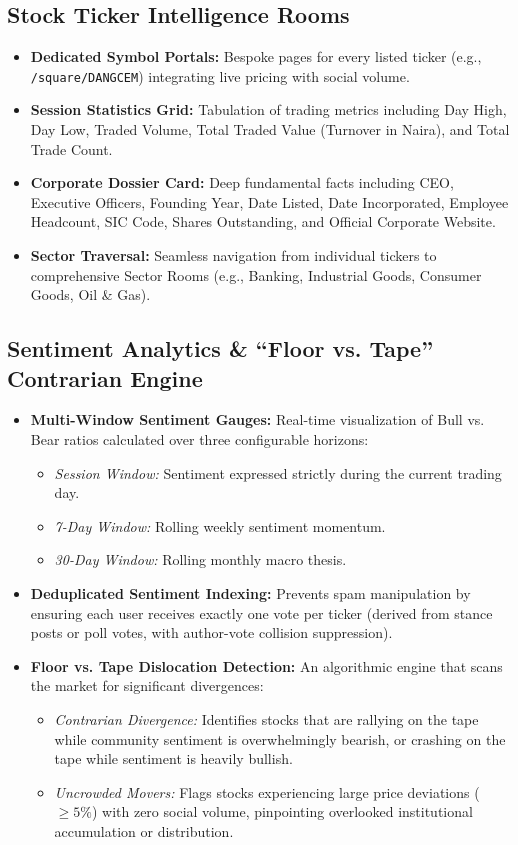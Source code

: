 \documentclass[11pt,a4paper]{article}
\begin{document}
\subsection{Stock Ticker Intelligence Rooms}
\begin{itemize}
    \item \textbf{Dedicated Symbol Portals:} Bespoke pages for every listed ticker (e.g., \texttt{/square/DANGCEM}) integrating live pricing with social volume.
    \item \textbf{Session Statistics Grid:} Tabulation of trading metrics including Day High, Day Low, Traded Volume, Total Traded Value (Turnover in Naira), and Total Trade Count.
    \item \textbf{Corporate Dossier Card:} Deep fundamental facts including CEO, Executive Officers, Founding Year, Date Listed, Date Incorporated, Employee Headcount, SIC Code, Shares Outstanding, and Official Corporate Website.
    \item \textbf{Sector Traversal:} Seamless navigation from individual tickers to comprehensive Sector Rooms (e.g., Banking, Industrial Goods, Consumer Goods, Oil \& Gas).
\end{itemize}

\subsection{Sentiment Analytics \& ``Floor vs. Tape'' Contrarian Engine}
\begin{itemize}
    \item \textbf{Multi-Window Sentiment Gauges:} Real-time visualization of Bull vs. Bear ratios calculated over three configurable horizons:
    \begin{itemize}
        \item \textit{Session Window:} Sentiment expressed strictly during the current trading day.
        \item \textit{7-Day Window:} Rolling weekly sentiment momentum.
        \item \textit{30-Day Window:} Rolling monthly macro thesis.
    \end{itemize}
    \item \textbf{Deduplicated Sentiment Indexing:} Prevents spam manipulation by ensuring each user receives exactly one vote per ticker (derived from stance posts or poll votes, with author-vote collision suppression).
    \item \textbf{Floor vs. Tape Dislocation Detection:} An algorithmic engine that scans the market for significant divergences:
    \begin{itemize}
        \item \textit{Contrarian Divergence:} Identifies stocks that are rallying on the tape while community sentiment is overwhelmingly bearish, or crashing on the tape while sentiment is heavily bullish.
        \item \textit{Uncrowded Movers:} Flags stocks experiencing large price deviations ($\ge 5\%$) with zero social volume, pinpointing overlooked institutional accumulation or distribution.
    \end{itemize}
\end{itemize}
\end{document}
